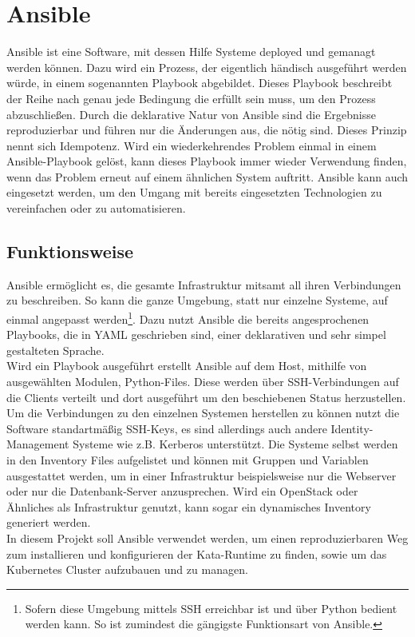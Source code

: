 \section{Ansible}
Ansible ist eine Software, mit dessen Hilfe Systeme deployed und gemanagt werden können. 
Dazu wird ein Prozess, der eigentlich händisch ausgeführt werden würde, in einem sogenannten Playbook abgebildet.
Dieses Playbook beschreibt der Reihe nach genau jede Bedingung die erfüllt sein muss, um den Prozess abzuschließen.
Durch die deklarative Natur von Ansible sind die Ergebnisse reproduzierbar und führen nur die Änderungen aus, die nötig sind.
Dieses Prinzip nennt sich Idempotenz.
Wird ein wiederkehrendes Problem einmal in einem Ansible-Playbook gelöst, kann dieses Playbook immer wieder Verwendung finden, wenn das Problem erneut auf einem ähnlichen System auftritt.
Ansible kann auch eingesetzt werden, um den Umgang mit bereits eingesetzten Technologien zu vereinfachen oder zu automatisieren.
\cite{ansible}

\subsection{Funktionsweise}
Ansible ermöglicht es, die gesamte Infrastruktur mitsamt all ihren Verbindungen zu beschreiben. 
So kann die ganze Umgebung, statt nur einzelne Systeme, auf einmal angepasst werden\footnote{Sofern diese Umgebung mittels \ac{SSH} erreichbar ist und über Python bedient werden kann. So ist zumindest die gängigste Funktionsart von Ansible.}.
Dazu nutzt Ansible die bereits angesprochenen Playbooks, die in \ac{YAML} geschrieben sind, einer deklarativen und sehr simpel gestalteten Sprache.
\\
Wird ein Playbook ausgeführt erstellt Ansible auf dem Host, mithilfe von ausgewählten Modulen, Python-Files. 
Diese werden über \ac{SSH}-Verbindungen auf die Clients verteilt und dort ausgeführt um den beschiebenen Status herzustellen.
Um die Verbindungen zu den einzelnen Systemen herstellen zu können nutzt die Software standartmäßig \ac{SSH}-Keys, es sind allerdings auch andere Identity-Management Systeme wie z.B. Kerberos unterstützt.
Die Systeme selbst werden in den Inventory Files aufgelistet und können mit Gruppen und Variablen ausgestattet werden, um in einer Infrastruktur beispielsweise nur die Webserver oder nur die Datenbank-Server anzusprechen.
Wird ein OpenStack oder Ähnliches als Infrastruktur genutzt, kann sogar ein dynamisches Inventory generiert werden.
\cite{how_ansible_works}
\\
In diesem Projekt soll Ansible verwendet werden, um einen reproduzierbaren Weg zum installieren und konfigurieren der Kata-Runtime zu finden, sowie um das Kubernetes Cluster aufzubauen und zu managen. 


